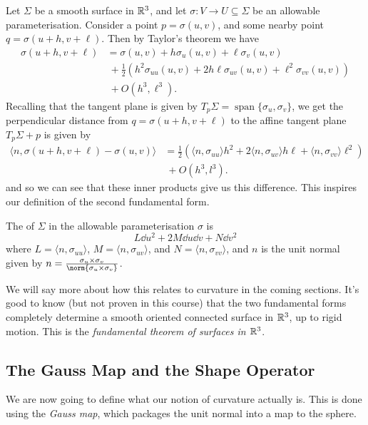 \documentclass[a4paper]{scrartcl}
\begin{document}
Let $\Sigma$ be a smooth surface in $\mathbb{R}^3$, and let $\sigma: V \rightarrow U \subseteq \Sigma$ be an allowable parameterisation. Consider a point $p = \sigma(u, v)$, and some nearby point $q = \sigma(u + h, v + \ell)$. Then by Taylor's theorem we have
\begin{align*}
\sigma(u + h, v + \ell) &= \sigma(u, v) + h \sigma_u(u, v) + \ell \sigma_v(u, v) \\
&\ + \frac{1}{2}\left(h^2 \sigma_{uu}(u, v) + 2 h\ell \sigma_{uv}(u, v) + \ell^2 \sigma_{vv}(u, v)\right)\\&\ + O(h^3, \ell^3).
\end{align*}
Recalling that the tangent plane is given by $T_p\Sigma = \operatorname{span}\{\sigma_u, \sigma_v\}$, we get the perpendicular distance from $q = \sigma(u + h, v+\ell)$ to the affine tangent plane $T_p\Sigma + p$ is given by
\begin{align*}
    \langle n, \sigma(u + h, v + \ell) - \sigma(u, v)\rangle &= \frac{1}{2}\left(\langle n, \sigma_{uu} \rangle h^2 + 2 \langle n, \sigma_{uv}\rangle h \ell + \langle n, \sigma_{vv} \rangle \ell^2\right)\\&\  + O(h^3, l^3). 
\end{align*}
and so we can see that these inner products give us this difference. This inspires our definition of the second fundamental form.

\begin{definition}
    The  of $\Sigma$ in the allowable parameterisation $\sigma$ is
    $$
    L \dd u^2 + 2M \dd u \dd v + N \dd v^2
    $$
    where $L = \langle n, \sigma_{uu} \rangle$, $M =  \langle n, \sigma_{uv} \rangle$, and $N = \langle n, \sigma_{vv} \rangle$, and $n$ is the unit normal given by $n = \frac{\sigma_u \times \sigma_v}{\norm{\sigma_u \times \sigma_v}}$.
\end{definition}

We will say more about how this relates to curvature in the coming sections. It's good to know (but not proven in this course) that the two fundamental forms completely determine a smooth oriented connected surface in $\mathbb{R}^3$, up to rigid motion. This is the \emph{fundamental theorem of surfaces in $\mathbb{R}^3$}.

\subsection{The Gauss Map and the Shape Operator}

We are now going to define what our notion of curvature actually is. This is done using the \emph{Gauss map}, which packages the unit normal into a map to the sphere.
\end{document}
